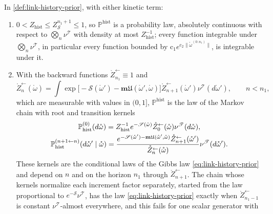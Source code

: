 In \cref{def:link-history-prior}, with either kinetic term:
\begin{enumerate}
\item[(a)] $0<Z_{\mathrm{hist}}\leq Z_{\mathscr S}^{n_1+1}\leq1$, so
$\mathbb P^{\mathrm{hist}}$ is a probability law, absolutely continuous with respect to
$\bigotimes_n\nu^{\mathscr T}$ with density at most $Z_{\mathrm{hist}}^{-1}$; every function
integrable under $\bigotimes_n\nu^{\mathscr T}$, in particular every function bounded by
$\mathrm c_1e^{\mathrm c_2\lVert\mathring\omega^{(0:n_1)}\rVert}$, is integrable under it.
\item[(b)] With the backward functions $\mathring Z^{\leftarrow}_{n_1}\equiv1$ and
\begin{equation}
\mathring Z^{\leftarrow}_n(\mathring\omega)=\int\exp\bigl[-\mathscr S(\mathring\omega')-\mathbf m\mathfrak U(\mathring\omega',\mathring\omega)\bigr]\mathring Z^{\leftarrow}_{n+1}(\mathring\omega')\nu^{\mathscr T}(d\mathring\omega'),
\qquad n<n_1,
\label{eq:link-backward-functions}
\end{equation}
which are measurable with values in $(0,1]$, $\mathbb P^{\mathrm{hist}}$ is the law of the Markov chain
with root and transition kernels
\begin{equation}
\begin{gathered}
\mathbb P^{(0)}_{\mathrm{hist}}(d\mathring\omega)=Z_{\mathrm{hist}}^{-1}e^{-\mathscr S(\mathring\omega)}\mathring Z^{\leftarrow}_0(\mathring\omega)\nu^{\mathscr T}(d\mathring\omega),\\
\mathbb P^{(n+1\leftarrow n)}_{\mathrm{hist}}(d\mathring\omega'\mid\mathring\omega)
=\frac{e^{-\mathscr S(\mathring\omega')-\mathbf m\mathfrak U(\mathring\omega',\mathring\omega)}\mathring Z^{\leftarrow}_{n+1}(\mathring\omega')}{\mathring Z^{\leftarrow}_n(\mathring\omega)}\nu^{\mathscr T}(d\mathring\omega').
\end{gathered}
\label{eq:link-history-kernels}
\end{equation}
These kernels are the conditional laws of the Gibbs law \eqref{eq:link-history-prior} and depend on
$n$ and on the horizon $n_1$ through $\mathring Z^{\leftarrow}_{n+1}$. The chain whose kernels normalize each
increment factor separately, started from the law proportional to $e^{-\mathscr S}\nu^{\mathscr T}$,
has the law \eqref{eq:link-history-prior} exactly when $\mathring Z^{\leftarrow}_{n_1-1}$ is constant
$\nu^{\mathscr T}$-almost everywhere, and this fails for one scalar generator with

\end{enumerate}

